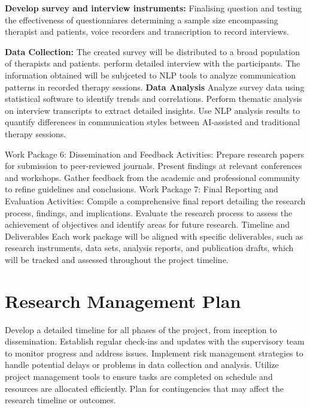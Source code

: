 \documentclass[12pt]{article}
\begin{document}
    \textbf{Develop survey and interview instruments:} Finalising question and testing the effectiveness of questionniares
    determining a sample size encompassing therapist and patients, voice recorders and transcription to record interviews.

    \textbf {Data Collection:} The created survey will be distributed to a broad population of therapists and patients.
    perform detailed interview with the participants. The information obtained will be subjceted to NLP tools to analyze communication patterns in recorded therapy sessions.
    \textbf {Data Analysis}
    Analyze survey data using statistical software to identify trends and correlations.
    Perform thematic analysis on interview transcripts to extract detailed insights.
    Use NLP analysis results to quantify differences in communication styles between AI-assisted and traditional therapy sessions.

    Work Package 6: Dissemination and Feedback
    Activities:
    Prepare research papers for submission to peer-reviewed journals.
    Present findings at relevant conferences and workshops.
    Gather feedback from the academic and professional community to refine guidelines and conclusions.
    Work Package 7: Final Reporting and Evaluation
    Activities:
    Compile a comprehensive final report detailing the research process, findings, and implications.
    Evaluate the research process to assess the achievement of objectives and identify areas for future research.
    Timeline and Deliverables
    Each work package will be aligned with specific deliverables, such as research instruments, data sets, analysis reports, and publication drafts, which will be tracked and assessed throughout the project timeline.




    \section{Research Management Plan}
    Develop a detailed timeline for all phases of the project, from inception to dissemination.
    Establish regular check-ins and updates with the supervisory team to monitor progress and address issues.
    Implement risk management strategies to handle potential delays or problems in data collection and analysis.
    Utilize project management tools to ensure tasks are completed on schedule and resources are allocated efficiently.
    Plan for contingencies that may affect the research timeline or outcomes.
\end{document}
